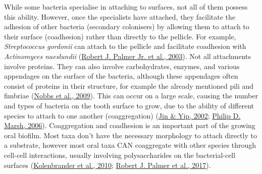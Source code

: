 \documentclass[
  letterpaper,
]{book}
\begin{document}
While some bacteria specialise in attaching to surfaces, not all of them
possess this ability. However, once the specialists have attached, they
facilitate the adhesion of other bacteria (secondary colonisers) by
allowing them to attach to their surface (coadhesion) rather than
directly to the pellicle. For example, \emph{Streptococcus gordonii} can
attach to the pellicle and facilitate coadhesion with \emph{Actinomyces
naeslundii}
(\protect\hyperlink{ref-palmerCoaggregationInteractions2003}{Robert J.
Palmer Jr. et al., 2003}). Not all attachments involve proteins. They
can also involve carbohydrates, enzymes, and various appendages on the
surface of the bacteria, although these appendages often consist of
proteins in their structure, for example the already mentioned pili and
fimbriae (\protect\hyperlink{ref-nobbsStreptococcusAdherence2009}{Nobbs
et al., 2009}). This can occur on a large scale, causing the number and
types of bacteria on the tooth surface to grow, due to the ability of
different species to attach to one another (coaggregation)
(\protect\hyperlink{ref-jinSupragingivalCalculus2002}{Jin \& Yip, 2002};
\protect\hyperlink{ref-marshDentalPlaque2006}{Philip D. Marsh, 2006}).
Coaggregation and coadhesion is an important part of the growing oral
biofilm. Most taxa don't have the necessary morphology to attach
directly to a substrate, however most oral taxa CAN coaggregate with
other species through cell-cell interactions, usually involving
polysaccharides on the bacterial-cell surfaces
(\protect\hyperlink{ref-kolenbranderOralMultispecies2010}{Kolenbrander
et al., 2010};
\protect\hyperlink{ref-palmerInterbacterialAdhesion2017}{Robert J.
Palmer et al., 2017}).
\end{document}
